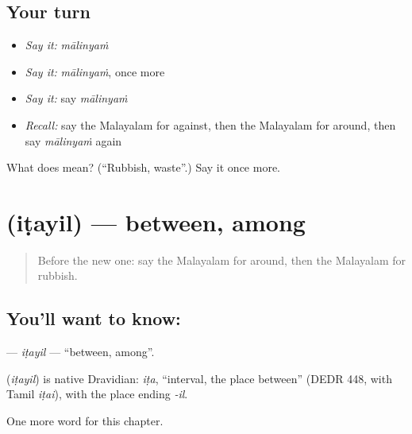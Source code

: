 \subsection*{Your turn}
\begin{itemize}
\raggedright
  \item \emph{Say it:} \emph{mālinyaṁ}
  \item \emph{Say it:} \emph{mālinyaṁ}, once more
  \item \emph{Say it:} say \emph{mālinyaṁ}
  \item \emph{Recall:} say the Malayalam for against, then the Malayalam for around, then say \emph{mālinyaṁ} again
\end{itemize}

\begin{tcolorbox}[breakable,colback=teal!4,colframe=teal!35!black,title={Before you move on}]
What does  mean? (\textquotedblleft{}Rubbish, waste\textquotedblright{}.) Say it once more.
\end{tcolorbox}
\section[\texorpdfstring{\ml{ഇടയിൽ} (iṭayil)}{ഇടയിൽ (iṭayil)}]{ (iṭayil) — between, among}

\label{lesson:ML-C199-itayil}



\begin{quote}
Before the new one: say the Malayalam for around, then the Malayalam for rubbish.
\end{quote}

\subsection*{You'll want to know: }
\textbf{} — \emph{iṭayil} — \textquotedblleft{}between, among\textquotedblright{}.

\begin{cousinweb}
\textbf{} (\emph{iṭayil}) is native Dravidian: \emph{iṭa}, \textquotedblleft{}interval, the place between\textquotedblright{} (DEDR 448, with Tamil \emph{iṭai}), with the place ending \emph{-il}.
\end{cousinweb}

\begin{grammarlens}[title={What you've built}]
One more word for this chapter.
\end{grammarlens}

